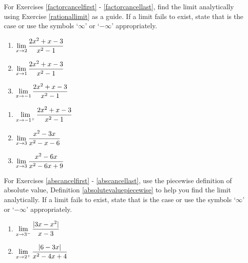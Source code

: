 For Exercises \ref{factorcancelfirst} - \ref{factorcancellast}, find the limit analytically using Exercise \ref{rationallimit} as a guide.  If a limit fails to exist, state that is the case  or use the symbols `$\infty$' or `$-\infty$' appropriately.
 
\begin{multicols}{3}

\begin{enumerate}
\setcounter{enumi}{\value{HW}}

\item\label{factorcancelfirst}  $\displaystyle{\lim_{x \rightarrow 2} \dfrac{2x^2+x-3}{x^2-1}}$
  
\item  $\displaystyle{\lim_{x \rightarrow 1} \dfrac{2x^2+x-3}{x^2-1}}$

\item   $\displaystyle{\lim_{x \rightarrow -1} \dfrac{2x^2+x-3}{x^2-1}}$

\setcounter{HW}{\value{enumi}}
\end{enumerate}

\end{multicols}

\begin{multicols}{3}

\begin{enumerate}
\setcounter{enumi}{\value{HW}}

\item   $\displaystyle{\lim_{x \rightarrow -1^{+}} \dfrac{2x^2+x-3}{x^2-1}}$

\item  $\displaystyle{\lim_{x \rightarrow 3} \dfrac{x^2-3x}{x^2-x-6}}$

\item\label{factorcancellast}  $\displaystyle{\lim_{x \rightarrow 3} \dfrac{x^2-6x}{x^2-6x+9}}$

\setcounter{HW}{\value{enumi}}
\end{enumerate}

\end{multicols}

For Exercises \ref{abscancelfirst} - \ref{abscancellast}, use the piecewise definition of absolute value, Definition \ref{absolutevaluepiecewise} to help you find the limit analytically.    If a limit fails to exist, state that is the case  or use the symbols `$\infty$' or `$-\infty$' appropriately.

\begin{multicols}{2}
\begin{enumerate}
\setcounter{enumi}{\value{HW}}

\item\label{abscancelfirst} $\displaystyle{ \lim_{x \rightarrow 3^{-}} \dfrac{|3x - x^2| }{x-3}}$     

\item\label{abscancellast}  $\displaystyle{\lim_{x \rightarrow 2^{+}} \dfrac{|6-3x|}{x^2-4x+4}}$

\setcounter{HW}{\value{enumi}}
\end{enumerate}
\end{multicols}

